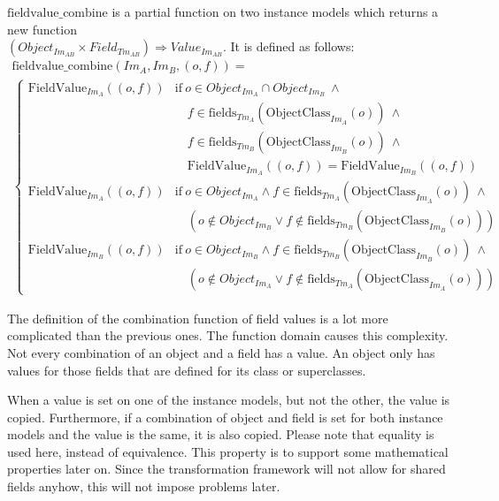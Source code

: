\begin{defin}
\label{defin:transformation_framework:instance_models_and_instance_graphs:combining_instance_models:fieldvalue_combine}
$\mathrm{fieldvalue\_\!combine}$ is a partial function on two instance models which returns a new function \\$(Object_{Im_{AB}} \times Field_{Tm_{AB}}) \Rightarrow Value_{Im_{AB}}$. It is defined as follows:
\begin{multline*}
    \mathrm{fieldvalue\_\!combine}(Im_A, Im_B, ( o, f )) = \\
    \begin{cases}
        \mathrm{FieldValue}_{Im_A}(( o, f )) & \mathrm{if}\ o \in Object_{Im_A} \cap Object_{Im_B}\ \land\\&\quad f \in \mathrm{fields}_{Tm_A}(\mathrm{ObjectClass}_{Im_A}(o))\ \land\\&\quad f \in \mathrm{fields}_{Tm_B}(\mathrm{ObjectClass}_{Im_B}(o))\ \land\\&\quad \mathrm{FieldValue}_{Im_A}(( o, f )) = \mathrm{FieldValue}_{Im_B}(( o, f )) \\
        \mathrm{FieldValue}_{Im_A}(( o, f )) & \mathrm{if}\ o \in Object_{Im_A} \land f \in \mathrm{fields}_{Tm_A}(\mathrm{ObjectClass}_{Im_A}(o))\ \land\\&\quad (o \not\in Object_{Im_B} \lor f \not\in \mathrm{fields}_{Tm_B}(\mathrm{ObjectClass}_{Im_B}(o))) \\
        \mathrm{FieldValue}_{Im_B}(( o, f )) & \mathrm{if}\ o \in Object_{Im_B} \land f \in \mathrm{fields}_{Tm_B}(\mathrm{ObjectClass}_{Im_B}(o))\ \land\\&\quad (o \not\in Object_{Im_A} \lor f \not\in \mathrm{fields}_{Tm_A}(\mathrm{ObjectClass}_{Im_A}(o)))
    \end{cases}
\end{multline*}
\end{defin}

The definition of the combination function of field values is a lot more complicated than the previous ones. The function domain causes this complexity. Not every combination of an object and a field has a value. An object only has values for those fields that are defined for its class or superclasses.

When a value is set on one of the instance models, but not the other, the value is copied. Furthermore, if a combination of object and field is set for both instance models and the value is the same, it is also copied. Please note that equality is used here, instead of equivalence. This property is to support some mathematical properties later on. Since the transformation framework will not allow for shared fields anyhow, this will not impose problems later.

